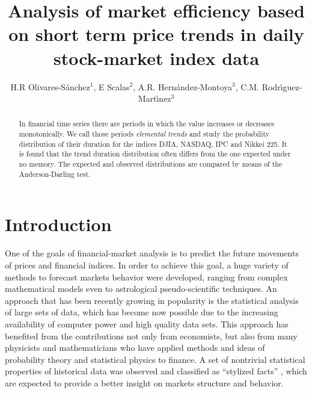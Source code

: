 \documentclass[a4paper]{jpconf}
\begin{document}
\title{Analysis of market efficiency based on short term price trends in daily stock-market index data}

\author{H.R Olivares-S\'anchez$^1$, E Scalas$^2$,  A.R. Hern\'andez-Montoya$^3$, C.M. Rodr\'{\i}guez-Mart\'{\i}nez$^3$}

\address{$^1$Facultad de F\'{\i}sica. Universidad Veracruzana, Apdo. Postal 475. Xalapa, Veracruz. M\'{e}xico.}

\address{$^2$Dipartimento di Scienze e Innovazione Tecnologica,
Universit\`a del Piemonte Orientale ``Amedeo Avogadro'', Viale T. Michel 11, 15121 Alessandria, Italy. BCAM-Basque Center for Applied Mathematics, Alameda de Mazarredo 14, 48009 Bilbao, Basque Contry, Spain.}

\address{$^3$Centro de Investigaci\'on en Inteligencia Artificial. Universidad Veracruzana. Sebasti\'an Camacho 5, Xalapa Veracruz 91000, M\'exico. Tel/Fax: 52-228-8172957/8172855.}



\begin{abstract}
In financial time series there are periods in which the value increases or decreases monotonically. We call those periods {\it elemental trends} and study the probability distribution of their duration for the indices DJIA, NASDAQ, IPC and Nikkei 225. It is found that the trend duration distribution often differs from the one expected under no memory. The expected and observed distributions are compared by means of the Anderson-Darling test.
\end{abstract}

\section{Introduction}
\label{intro}
One of the goals of financial-market analysis is to predict the future movements of prices and financial indices. In order to achieve this goal, a huge variety of methods to forecast markets behavior were developed, ranging from complex mathematical models even to astrological pseudo-scientific techniques. An approach that has been recently growing in popularity is the statistical analysis of large sets of data, which has become now possible due to the increasing availability of computer power and high quality data sets. This approach has benefited from the contributions not only from economists, but also from many physicists and mathematicians who have applied methods and ideas of probability theory and statistical physics to finance. A set of nontrivial statistical properties of historical data was observed and classified as ``stylized facts'' \cite{Rama}, which are expected to provide a better insight on markets structure and behavior.
\end{document}
